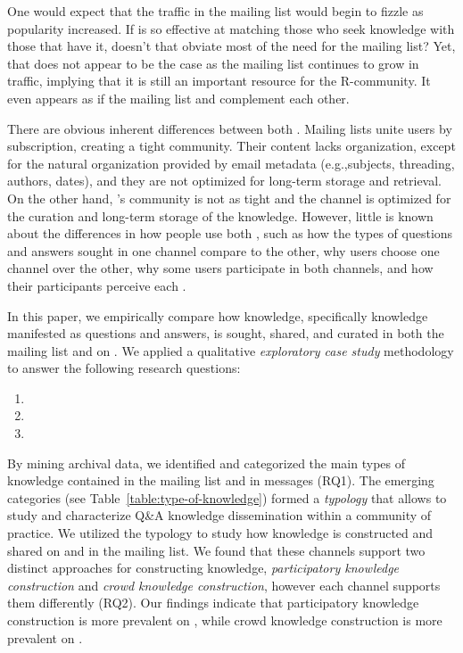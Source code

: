 One would expect that the traffic in the \RH mailing list would begin to fizzle as \SO popularity increased. If \SO is so effective at matching those who seek knowledge with those that have it, doesn't that obviate most of the need for the \RH mailing list? Yet, that does not appear to be the case as the \RH mailing list continues to grow in traffic, implying that it is still an important resource for the R-community. It even appears as if the mailing list and \SO complement each other.

There are obvious inherent differences between both \channels. Mailing lists unite users by subscription, creating a tight community. Their content lacks organization, except for the natural organization provided by email metadata (e.g.,subjects, threading, authors, dates), and they are not optimized for long-term storage and retrieval. On the other hand, \SO's community is not as tight and the channel is optimized for the curation and long-term storage of the knowledge. However, little is known about the differences in how people use both \channels, such as how the types of questions and answers sought in one channel compare to the other, why users choose one channel over the other, why some users participate in both channels, and how their participants perceive each \channel.



In this paper, we empirically compare how knowledge, specifically knowledge manifested as questions and answers, is sought, shared, and curated in both the \RH mailing list and on \SO. We applied a qualitative \textit{exploratory case study} methodology to answer the following research questions:

\begin{enumerate}[label=\bfseries{RQ\arabic*.},itemsep=3pt, topsep=2pt, leftmargin=3em, parsep=0pt]
        \item \rqa
        \item \rqb
        \item \rqc
    \end{enumerate}

By mining archival data, we identified and categorized the main types of knowledge contained in the \RH mailing list and in \SO messages (RQ1). The emerging categories (see Table~\ref{table:type-of-knowledge}) formed a \textit{typology} that allows to study and characterize Q\&A knowledge dissemination within a community of practice. We utilized the typology to study how knowledge is constructed and shared on \SO and in the \RH mailing list. We found that these channels support two distinct approaches for constructing knowledge, \textit{participatory knowledge construction} and \textit{crowd knowledge construction}, however each channel supports them differently (RQ2). Our findings indicate that participatory knowledge construction is more prevalent on \RH, while crowd knowledge construction is more prevalent on \SO.

